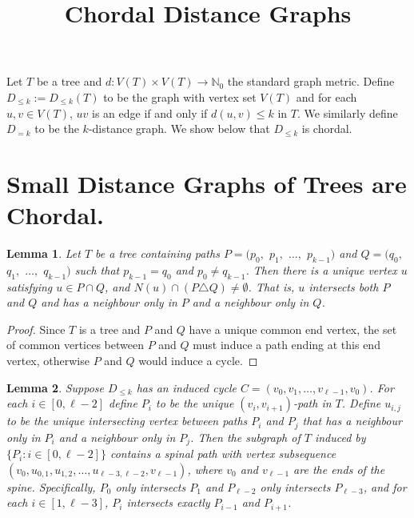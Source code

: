 \documentclass[12pt]{article}
\title{ \vspace{-3cm} Chordal Distance Graphs }
\newcommand{\N}{\mathbb{N}}
\newtheorem{lem}{Lemma} %
\theoremstyle{definition}
\begin{document}
	\maketitle
	
	Let $T$ be a tree and $d:V(T) \times V(T) \rightarrow \N_0$ the standard graph metric.  Define $D_{\leq k}:= D_{\leq k}(T)$ to be the graph with vertex set $V(T)$ and for each $u,v \in V(T)$, $uv$ is an edge if and only if $d(u,v) \leq k$ in $T$.  We similarly define $D_{=k}$ to be the $k$-distance graph.  We show below that $D_{\leq k}$ is chordal.
	
	\section{Small Distance Graphs of Trees are Chordal.}
	\begin{lem}\label{Lemma-IntersectingVertex}
		Let $T$ be a tree containing paths $P = (p_0,$ $p_1,$ $\ldots,$ $p_{k-1})$ and $Q = (q_0,$ $q_1,$ $\ldots,$ $q_{k-1})$ such that $p_{k-1} = q_0$ and $p_0 \neq q_{k-1}$.  Then there is a unique vertex $u$ satisfying $u \in P \cap Q$, and $N(u) \cap (P \triangle Q) \neq \emptyset$.  That is, $u$ intersects both $P$ and $Q$ and has a neighbour only in $P$ and a neighbour only in $Q$.
	\end{lem}
	\begin{proof}
		Since $T$ is a tree and $P$ and $Q$ have a unique common end vertex, the set of common vertices between $P$ and $Q$ must induce a path ending at this end vertex, otherwise $P$ and $Q$ would induce a cycle.\qedhere
	\end{proof}
	
	\begin{lem}\label{Lemma-WheelCase}
		Suppose $D_{\leq k}$ has an induced cycle $C = (v_0,v_1, \ldots, v_{\ell-1},v_0)$.  For each $i \in [0,\ell-2]$ define $P_i$ to be the unique $(v_i,v_{i+1})$-path in $T$.  Define $u_{i,j}$ to be the unique intersecting vertex between paths $P_i$ and $P_j$ that has a neighbour only in $P_i$ and a neighbour only in $P_j$.  Then the subgraph of $T$ induced by $\{P_i: i \in [0,\ell-2]\}$ contains a spinal path with vertex subsequence $(v_0,u_{0,1}, u_{1,2}, \ldots, u_{\ell-3,\ell-2}, v_{\ell - 1})$, where $v_0$ and $v_{\ell-1}$ are the ends of the spine.  Specifically, $P_0$ only intersects $P_1$ and $P_{\ell-2}$ only intersects $P_{\ell-3}$, and for each $i \in [1, \ell-3]$, $P_i$ intersects exactly $P_{i-1}$ and $P_{i+1}$.
	\end{lem}
\end{document}
